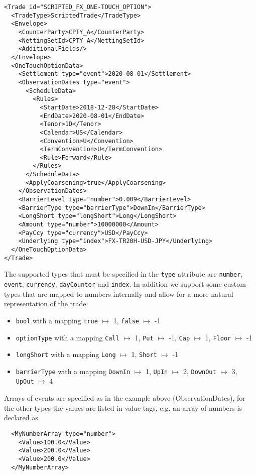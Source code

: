 \begin{verbatim}
<Trade id="SCRIPTED_FX_ONE-TOUCH_OPTION">
  <TradeType>ScriptedTrade</TradeType>
  <Envelope>
    <CounterParty>CPTY_A</CounterParty>
    <NettingSetId>CPTY_A</NettingSetId>
    <AdditionalFields/>
  </Envelope>
  <OneTouchOptionData>
    <Settlement type="event">2020-08-01</Settlement>
    <ObservationDates type="event">
      <ScheduleData>
        <Rules>
          <StartDate>2018-12-28</StartDate>
          <EndDate>2020-08-01</EndDate>
          <Tenor>1D</Tenor>
          <Calendar>US</Calendar>
          <Convention>U</Convention>
          <TermConvention>U</TermConvention>
          <Rule>Forward</Rule>
        </Rules>
      </ScheduleData>
      <ApplyCoarsening>true</ApplyCoarsening>
    </ObservationDates>
    <BarrierLevel type="number">0.009</BarrierLevel>
    <BarrierType type="barrierType">DownIn</BarrierType>
    <LongShort type="longShort">Long</LongShort>
    <Amount type="number">10000000</Amount>
    <PayCcy type="currency">USD</PayCcy>
    <Underlying type="index">FX-TR20H-USD-JPY</Underlying>
  </OneTouchOptionData>
</Trade>
\end{verbatim}

The supported types that must be specified in the \verb+type+ attribute are \verb+number+, \verb+event+,
\verb+currency+, \verb+dayCounter+ and \verb+index+. In addition we support some custom types that are mapped to numbers
internally and allow for a more natural representation of the trade:

\begin{itemize}
\item \verb+bool+ with a mapping \verb+true+ $\mapsto$ 1, \verb+false+ $\mapsto$ -1 
\item \verb+optionType+ with a mapping \verb+Call+ $\mapsto$ 1, \verb+Put+ $\mapsto$ -1, \verb+Cap+ $\mapsto$ 1,
  \verb+Floor+ $\mapsto$ -1
\item \verb+longShort+ with a mapping \verb+Long+ $\mapsto$ 1, \verb+Short+ $\mapsto$ -1
\item \verb+barrierType+ with a mapping \verb+DownIn+ $\mapsto$ 1, \verb+UpIn+ $\mapsto$ 2, \verb+DownOut+ $\mapsto$ 3,
  \verb+UpOut+ $\mapsto$ 4
\end{itemize}

Arrays of events are specified as in the example above (ObservationDates), for the other types the values are listed in
value tags, e.g. an array of numbers is declared as

\begin{verbatim}
  <MyNumberArray type="number">
    <Value>100.0</Value>
    <Value>200.0</Value>
    <Value>200.0</Value>  
  </MyNumberArray>
\end{verbatim}
